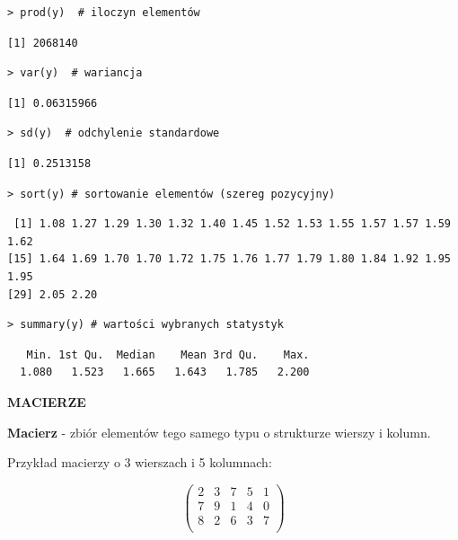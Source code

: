 \documentclass[12pt,B5paper,]{book}
\begin{document}
\begin{verbatim}
> prod(y)  # iloczyn elementów 
\end{verbatim}

\begin{verbatim}
[1] 2068140
\end{verbatim}

\begin{verbatim}
> var(y)  # wariancja
\end{verbatim}

\begin{verbatim}
[1] 0.06315966
\end{verbatim}

\begin{verbatim}
> sd(y)  # odchylenie standardowe
\end{verbatim}

\begin{verbatim}
[1] 0.2513158
\end{verbatim}

\begin{verbatim}
> sort(y) # sortowanie elementów (szereg pozycyjny)
\end{verbatim}

\begin{verbatim}
 [1] 1.08 1.27 1.29 1.30 1.32 1.40 1.45 1.52 1.53 1.55 1.57 1.57 1.59 1.62
[15] 1.64 1.69 1.70 1.70 1.72 1.75 1.76 1.77 1.79 1.80 1.84 1.92 1.95 1.95
[29] 2.05 2.20
\end{verbatim}

\begin{verbatim}
> summary(y) # wartości wybranych statystyk
\end{verbatim}

\begin{verbatim}
   Min. 1st Qu.  Median    Mean 3rd Qu.    Max. 
  1.080   1.523   1.665   1.643   1.785   2.200 
\end{verbatim}

\vspace{0.8cm} \textbf{MACIERZE}

\vspace{0.8cm} \textbf{Macierz} - zbiór elementów tego samego typu o
strukturze wierszy i kolumn.

Przykład macierzy o 3 wierszach i 5 kolumnach:

\[
  \begin{pmatrix}
2 &  3 & 7&  5 & 1 \\ 
7 & 9 & 1 & 4 & 0 \\
8 & 2 & 6 & 3 & 7 \\
\end{pmatrix}
\]
\end{document}
